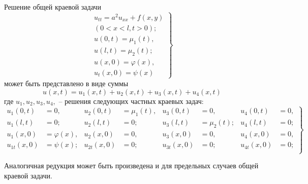 Решение общей краевой задачи 
\begin{equation}
	\left.
	\begin{aligned}
		u_{tt} = a^2 u_{xx} + f(x, y)\\
		(0 < x < l, t > 0);\\
		u(0, t) = \mu_1 (t),\\
		u(l, t) = \mu_2 (t);\\
		u(x, 0) = \varphi(x),\\
		u_t(x, 0) = \psi (x)
	\end{aligned}
	\right\}
	\label{equ:Reduction6}
\end{equation}
может быть представлено в виде суммы 
\[
	u(x, t) = u_1(x, t) + u_2 (x, t) + u_3 (x, t) + u_4 (x, t)
\]
где $u_1, u_2, u_3, u_4,$ -- решения следующих частных краевых задач:
\begin{equation}
	\left.
	\begin{aligned}
		u_1(0, t) &= 0, &u_2(0, t) &= \mu_1 (t), &u_3(0, t) &= 0,  &u_4(0, t) &= 0,\\
		u_1(l, t) &= 0; &u_2(l, t) &= 0; &u_3(l, t) &= \mu_2(t);  &u_4(l, t) &= 0;\\
		u_1(x, 0) &= \varphi(x), &u_2(x, 0) &= 0, &u_3(x, 0) &= 0,  &u_4(x, 0) &= 0,\\
		u_{1t}(x, 0) &= \psi(x); &u_{2t}(x, 0) &= 0; &u_{3t}(x, 0) &= 0;  &u_{4t}(x, 0) &= 0;\\
	\end{aligned}
	\right\}
	\label{equ:Reduction6}
\end{equation}

Аналогичная редукция может быть произведена и для предельных случаев общей краевой задачи.
